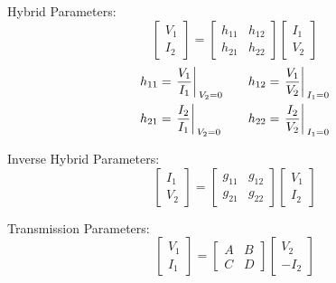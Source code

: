 \begin{multicols}{2}
\begin{CheatsheetEntryFrame}
        Hybrid Parameters:
        \begin{equation*}
            \begin{bmatrix}
                V_1 \\
                I_2
            \end{bmatrix}
            =
            \begin{bmatrix}
                h_{11} & h_{12} \\
                h_{21} & h_{22}
            \end{bmatrix}
            \begin{bmatrix}
                I_1 \\
                V_2
            \end{bmatrix}
        \end{equation*}
        \begin{align*}
            h_{11} &= {\left.\frac{V_1}{I_1}\right\rvert{}}_{V_2 = 0} \quad &
            h_{12} &= {\left.\frac{V_1}{V_2}\right\rvert{}}_{I_1 = 0} \\
            h_{21} &= {\left.\frac{I_2}{I_1}\right\rvert{}}_{V_2 = 0} \quad &
            h_{22} &= {\left.\frac{I_2}{V_2}\right\rvert{}}_{I_1 = 0}
        \end{align*}

        Inverse Hybrid Parameters:
        \begin{equation*}
            \begin{bmatrix}
                I_1 \\
                V_2
            \end{bmatrix}
            =
            \begin{bmatrix}
                g_{11} & g_{12} \\
                g_{21} & g_{22}
            \end{bmatrix}
            \begin{bmatrix}
                V_1 \\
                I_2
            \end{bmatrix}
        \end{equation*}

        Transmission Parameters:
        \begin{equation*}
            \begin{bmatrix}
                V_1 \\
                I_1
            \end{bmatrix}
            =
            \begin{bmatrix}
                A & B \\
                C & D
            \end{bmatrix}
            \begin{bmatrix}
                V_2 \\
                -I_2
            \end{bmatrix}
        \end{equation*}


\end{CheatsheetEntryFrame}
\end{multicols}
